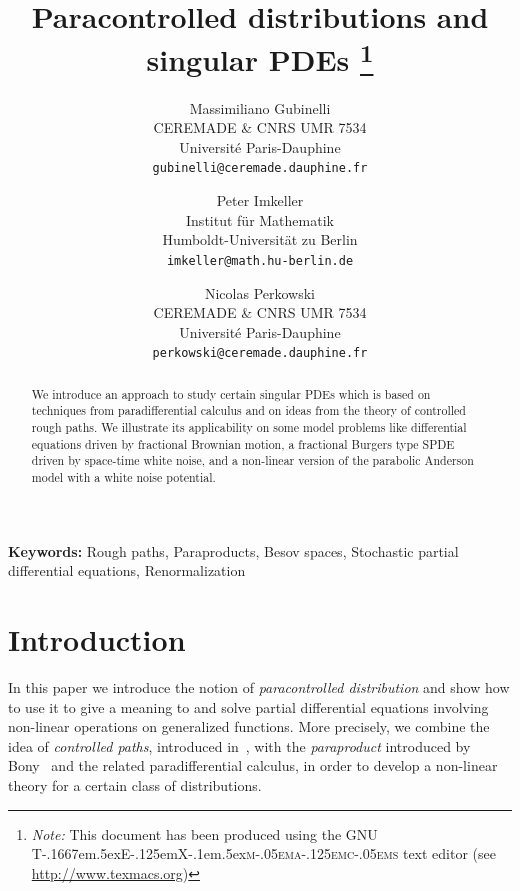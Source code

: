 \documentclass[11pt,a4paper]{article}
\newcommand{\TeXmacs}{T\kern-.1667em\lower.5ex\hbox{E}\kern-.125emX\kern-.1em\lower.5ex\hbox{\textsc{m\kern-.05ema\kern-.125emc\kern-.05ems}}}
\newcommand{\tmSep}{; }
\newcommand{\tmaffiliation}[1]{\thanks{\textit{Affiliation:} #1}}
\newcommand{\tmnote}[1]{\thanks{\textit{Note:} #1}}
\newcommand{\tmsep}{, }
\newcommand{\tmkeywords}{\textbf{Keywords:} }
\newcommand{\withTeXmacstext}{This document has been produced using the GNU {\TeXmacs} text editor (see \url{http://www.texmacs.org})}
\theoremstyle{remark}
\begin{document}
\title{Paracontrolled distributions and singular PDEs \tmnote{{\withTeXmacstext}}}

\author{
  Massimiliano Gubinelli \\ CEREMADE \& CNRS UMR 7534 \\ Universit{\'e} Paris-Dauphine\\
  \texttt{gubinelli@ceremade.dauphine.fr}
  \and
  Peter Imkeller \\ Institut f\"ur Mathematik \\ Humboldt-Universit\"at zu Berlin\\
  \texttt{imkeller@math.hu-berlin.de}
  \and
  Nicolas Perkowski \\  CEREMADE \& CNRS UMR 7534  \\ Universit{\'e} Paris-Dauphine\\
  \texttt{perkowski@ceremade.dauphine.fr}
}


\maketitle

\begin{abstract}
   We introduce an approach to study certain singular PDEs which is based on  techniques from paradifferential calculus and on ideas from the theory of controlled rough paths. We illustrate its applicability on some model problems like differential equations driven by fractional Brownian motion, a fractional Burgers type SPDE driven by space-time white noise, and a non-linear version of the parabolic Anderson model with a white noise potential.
\end{abstract}

\tmkeywords{Rough paths}{\tmsep}{Paraproducts}{\tmsep}{Besov spaces}{\tmsep}{Stochastic partial differential equations}{\tmsep}{Renormalization}


\section{Introduction}

In this paper we introduce the notion of \emph{paracontrolled distribution} and show how to use it to give a meaning to and solve partial differential equations involving non-linear operations on generalized functions.  More precisely, we combine the idea of \emph{controlled paths}, introduced  in~\cite{Gubinelli2004}, with the \emph{paraproduct} introduced by Bony~\cite{Bony1981} and the related paradifferential calculus, in order to develop a non-linear theory for a certain class of distributions.
\end{document}
